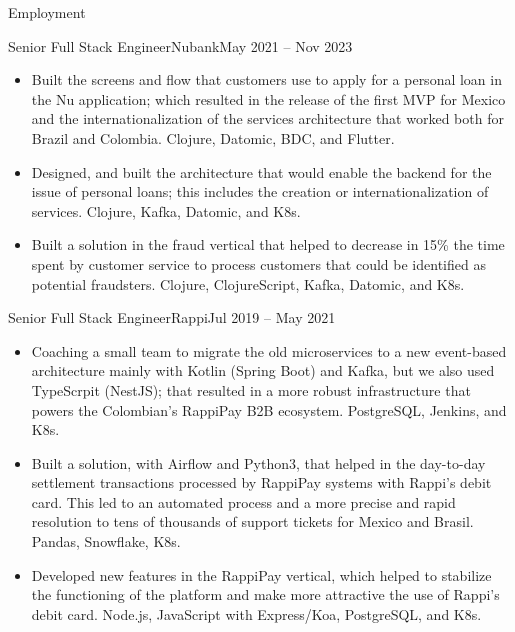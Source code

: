\documentclass[calibri]{../mcdowell-cv/mcdowellcv}
\begin{document}
\begin{cvsection}{Employment}
		\begin{cvsubsection}{Senior Full Stack Engineer}{Nubank}{May 2021 -- Nov 2023}
			\begin{itemize}
				\item Built the screens and flow that customers use to apply for a personal loan in the Nu application; which resulted in the release of the first MVP for Mexico and the internationalization of the services architecture that worked both for Brazil and Colombia. Clojure, Datomic, BDC, and Flutter.
				\item Designed, and built the architecture that would enable the backend for the issue of personal loans; this includes the creation or internationalization of services. Clojure, Kafka, Datomic, and K8s.
				\item Built a solution in the fraud vertical that helped to decrease in 15\% the time spent by customer service to process customers that could be identified as potential fraudsters. Clojure, ClojureScript, Kafka, Datomic, and K8s.
			\end{itemize}
		\end{cvsubsection}

		\begin{cvsubsection}{Senior Full Stack Engineer}{Rappi}{Jul 2019 -- May 2021}
			\begin{itemize}
				\item Coaching a small team to migrate the old microservices to a new event-based architecture mainly with Kotlin (Spring Boot) and Kafka, but we also used TypeScrpit (NestJS); that resulted in a more robust infrastructure that powers the Colombian's RappiPay B2B ecosystem. PostgreSQL, Jenkins, and K8s.
				\item Built a solution, with Airflow and Python3, that helped in the day-to-day settlement transactions processed by RappiPay systems with Rappi's debit card. This led to an automated process and a more precise and rapid resolution to tens of thousands of support tickets for Mexico and Brasil. Pandas, Snowflake, K8s.
				\item Developed new features in the RappiPay vertical, which helped to stabilize the functioning of the platform and make more attractive the use of Rappi's debit card. Node.js, JavaScript with Express/Koa, PostgreSQL, and K8s.
			\end{itemize}
		\end{cvsubsection}


\end{cvsection}
\end{document}
